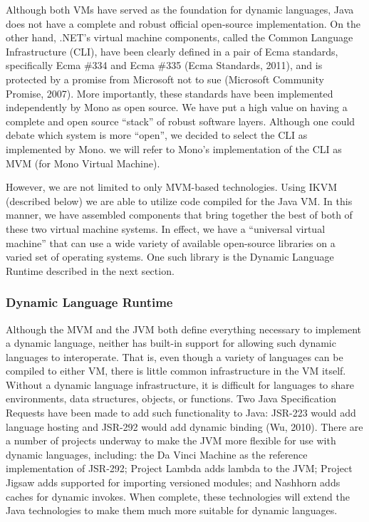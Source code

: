\documentclass[preprint]{sigplanconf}
\begin{document}
Although both VMs have served as the foundation for dynamic languages,
Java does not have a complete and robust official open-source
implementation. On the other hand, .NET's virtual machine components,
called the Common Language Infrastructure (CLI), have been clearly
defined in a pair of Ecma standards, specifically Ecma \#334 and Ecma
\#335 (Ecma Standards, 2011), and is protected by a promise from
Microsoft not to sue (Microsoft Community Promise, 2007). More
importantly, these standards have been implemented independently by
Mono as open source. We have put a high value on having a complete and
open source ``stack'' of robust software layers. Although one could
debate which system is more ``open'', we decided to select the CLI as
implemented by Mono. we will refer to Mono's implementation of the CLI
as MVM (for Mono Virtual Machine).

However, we are not limited to only MVM-based technologies. Using IKVM
(described below) we are able to utilize code compiled for the Java
VM. In this manner, we have assembled components that bring together
the best of both of these two virtual machine systems. In effect, we
have a ``universal virtual machine'' that can use a wide variety of
available open-source libraries on a varied set of operating
systems. One such library is the Dynamic Language Runtime described in
the next section.

\subsubsection{Dynamic Language Runtime}

Although the MVM and the JVM both define everything necessary to
implement a dynamic language, neither has built-in support for
allowing such dynamic languages to interoperate. That is, even though
a variety of languages can be compiled to either VM, there is little
common infrastructure in the VM itself. Without a dynamic language
infrastructure, it is difficult for languages to share environments,
data structures, objects, or functions. Two Java Specification
Requests have been made to add such functionality to Java: JSR-223
would add language hosting and JSR-292 would add dynamic binding (Wu,
2010). There are a number of projects underway to make the JVM more
flexible for use with dynamic languages, including: the Da Vinci
Machine \cite{davinci} as the reference implementation of JSR-292; Project Lambda
adds lambda to the JVM; Project Jigsaw adds supported for importing
versioned modules; and Nashhorn adds caches for dynamic invokes. When
complete, these technologies will extend the Java technologies to make
them much more suitable for dynamic languages.
\end{document}
